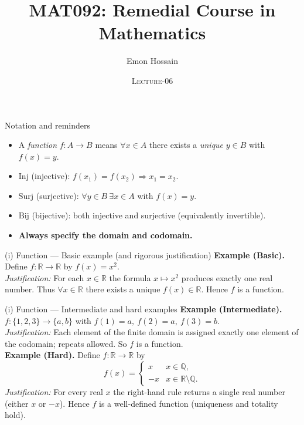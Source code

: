 \documentclass[11pt]{beamer}
\author[] %
{Emon Hossain\inst{1}}
\institute[University of Dhaka] %
{
  \inst{1}%
  Lecturer\\MNS department\\Brac University
}
\date[] %
{\textsc{Lecture-06}}
\title[]{MAT092: Remedial Course in Mathematics}
\theoremstyle{plain}
\begin{document}
\begin{frame}
\titlepage
\end{frame}

\begin{frame}{Notation and reminders}
  \begin{itemize}
    \item A \emph{function} \(f\colon A \to B\) means \(\forall x\in A\) there exists a \emph{unique} \(y\in B\) with \(f(x)=y\).
    \item \(\text{Inj}\) (injective): \(f(x_1)=f(x_2)\Rightarrow x_1=x_2\).
    \item \(\text{Surj}\) (surjective): \(\forall y\in B\ \exists x\in A\) with \(f(x)=y\).
    \item \(\text{Bij}\) (bijective): both injective and surjective (equivalently invertible).
    \item \textbf{Always specify the domain and codomain.}
  \end{itemize}
\end{frame}

\begin{frame}{(i) Function — Basic example (and rigorous justification)}
  \textbf{Example (Basic).} Define \(f:\mathbb{R}\to\mathbb{R}\) by \(f(x)=x^2\).\\[6pt]
  \pause
  \emph{Justification:} For each \(x\in\mathbb{R}\) the formula \(x\mapsto x^2\) produces exactly one real number. Thus \(\forall x\in\mathbb{R}\) there exists a unique \(f(x)\in\mathbb{R}\). Hence \(f\) is a function.
\end{frame}

\begin{frame}{(i) Function — Intermediate and hard examples}
  \textbf{Example (Intermediate).} \(f\colon\{1,2,3\}\to\{a,b\}\) with \(f(1)=a,\ f(2)=a,\ f(3)=b\).\\
  \pause
  \emph{Justification:} Each element of the finite domain is assigned exactly one element of the codomain; repeats allowed. So \(f\) is a function.\\[8pt]

  \textbf{Example (Hard).} Define \(f\colon\mathbb{R}\to\mathbb{R}\) by
  \[
    f(x)=\begin{cases}
      x & x\in\mathbb{Q},\\[2pt]
      -x & x\in\mathbb{R}\setminus\mathbb{Q}.
    \end{cases}
  \]
  \pause
  \emph{Justification:} For every real \(x\) the right-hand rule returns a single real number (either \(x\) or \(-x\)). Hence \(f\) is a well-defined function (uniqueness and totality hold).
\end{frame}
\end{document}

